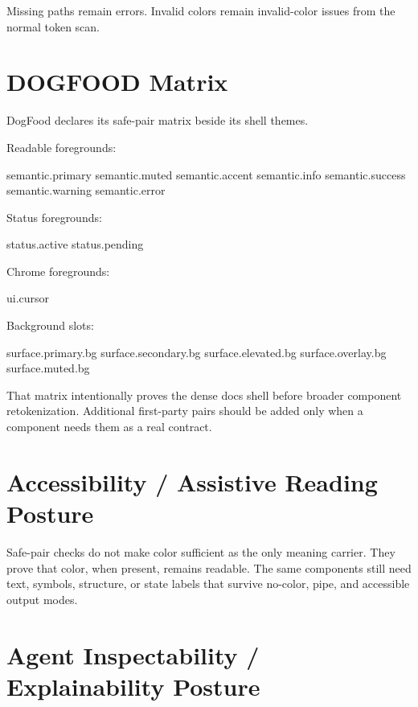 Missing paths remain errors. Invalid colors remain invalid-color issues from the normal token scan.

\section{DOGFOOD Matrix}\label{record-180-dogfood-matrix}

DogFood declares its safe-pair matrix beside its shell themes.

Readable foregrounds:

\begin{CodeBlock}
semantic.primary
semantic.muted
semantic.accent
semantic.info
semantic.success
semantic.warning
semantic.error
\end{CodeBlock}

Status foregrounds:

\begin{CodeBlock}
status.active
status.pending
\end{CodeBlock}

Chrome foregrounds:

\begin{CodeBlock}
ui.cursor
\end{CodeBlock}

Background slots:

\begin{CodeBlock}
surface.primary.bg
surface.secondary.bg
surface.elevated.bg
surface.overlay.bg
surface.muted.bg
\end{CodeBlock}

That matrix intentionally proves the dense docs shell before broader component retokenization. Additional first-party pairs should be added only when a component needs them as a real contract.

\section{Accessibility / Assistive Reading Posture}\label{record-180-accessibility-assistive-reading-posture}

Safe-pair checks do not make color sufficient as the only meaning carrier. They prove that color, when present, remains readable. The same components still need text, symbols, structure, or state labels that survive no-color, pipe, and accessible output modes.

\section{Agent Inspectability / Explainability Posture}\label{record-180-agent-inspectability-explainability-posture}

